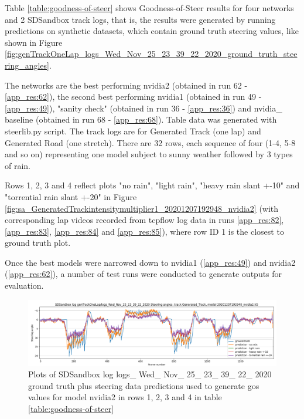 Table \ref{table:goodness-of-steer} shows Goodness-of-Steer results for four networks and 2 SDSandbox track logs, that is, the results were generated by running predictions on synthetic datasets, which contain ground truth steering values, like shown in Figure \ref{fig:genTrackOneLap_logs_Wed_Nov_25_23_39_22_2020_ground_truth_steering_angles}. 

The networks are the best performing nvidia2 (obtained in run 62 - \ref{app_res:62}), the second best performing nvidia1 (obtained in run 49 - \ref{app_res:49}), "sanity check" (obtained in run 36 - \ref{app_res:36}) and nvidia\_ baseline (obtained in run 68 - \ref{app_res:68}). Table data was generated with steerlib.py script. The track logs are for Generated Track (one lap) and Generated Road (one stretch). There are 32 rows, each sequence of four (1-4, 5-8 and so on) representing one model subject to sunny weather followed by 3 types of rain. 

Rows 1, 2, 3 and 4 reflect plots "no rain", "light rain", "heavy rain slant +-10" and "torrential rain slant +-20" in Figure \ref{fig:sa_GeneratedTrackintensitymultiplier1_20201207192948_nvidia2} (with corresponding lap videos recorded from tcpflow log data in runs \ref{app_res:82}, \ref{app_res:83}, \ref{app_res:84} and  \ref{app_res:85}), where row ID 1 is the closest to ground truth plot. 




Once the best models were narrowed down to nvidia1 (\ref{app_res:49}) and nvidia2 (\ref{app_res:62}), a number of test runs were conducted to generate outputs for evaluation. 





\begin{figure}[ht]
 \centering 
 \includegraphics[width=\textwidth]{Figures/sa_Generated_Track_20201207192948_nvidia2.h5.png}
 \caption{Plots of SDSandbox log logs\_ Wed\_ Nov\_ 25\_ 23\_ 39\_ 22\_ 2020 ground truth plus steering data predictions used to generate gos values for model nvidia2 in rows 1, 2, 3 and 4 in table \ref{table:goodness-of-steer}}
 \label{fig:sa_Generated_Track_20201207192948_nvidia2.h5} 
\end{figure}

